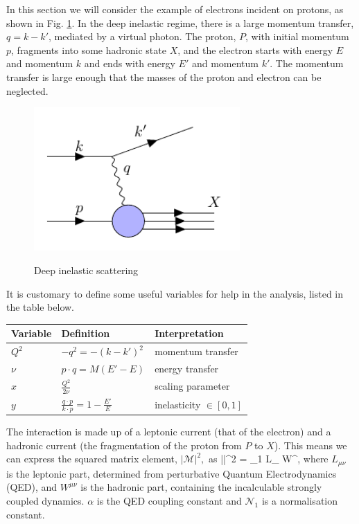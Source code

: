 In this section we will consider the example of electrons incident on protons, as shown in Fig. \ref{fig:dis}. In the deep inelastic regime, there is a large momentum transfer, $q=k-k'$, mediated by a virtual photon. The proton, $P$, with initial momentum $p$, fragments into some hadronic state $X$, and the electron starts with energy $E$ and momentum $k$ and ends with energy $E'$ and momentum $k'$. The momentum transfer is large enough that the masses of the proton and electron can be neglected. 

\begin{figure}[H]
\centering
\includegraphics[width=0.7\textwidth]{../diagrams/disdiag.pdf}
\label{fig:dis}
\caption{Deep inelastic scattering}
\end{figure}

It is customary to define some useful variables for help in the analysis, listed in the table below.
\begin{table}[H]
\centering
\begin{tabular}{l|l|l}
  Variable & Definition & Interpretation   \\
 \hline
  $Q^2$ & $- q^2 = -(k-k')^2$   & momentum transfer    \\
  $\nu$ & $p \cdot q = M(E'-E)$ & energy transfer  \\
  $x$   & $\frac{Q^2}{2\nu}$    & scaling parameter \\
  $y$   & $\frac{q \cdot p}{k \cdot p} = 1 - \frac{E'}{E}$ & inelasticity $\in [0,1]$
\end{tabular}
\end{table}
The interaction is made up of a leptonic current (that of the electron) and a hadronic current (the fragmentation of the proton from $P$ to $X$). This means we can express the squared matrix element, $|\mathcal{M}|^2,$ as
\be
\label{eqn:matrixelement}
||^2 = _1  L_{\mu\nu} W^{\mu\nu},
\ee
where $L_{\mu\nu}$ is the leptonic part, determined from perturbative Quantum Electrodynamics (QED), and $W^{\mu\nu}$ is the hadronic part, containing the incalculable strongly coupled dynamics. $\alpha$ is the QED coupling constant and $\mathcal{N}_1$ is a normalisation constant.

